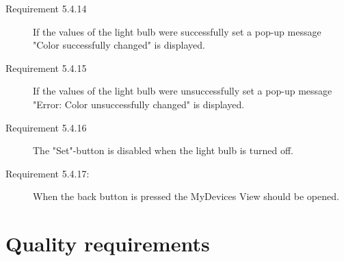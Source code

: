 \documentclass[a4paper]{article}
\begin{document}
\begin{description}
\item[Requirement 5.4.14] If the values of the light bulb were successfully set a pop-up message "Color successfully changed" is displayed.

\item[Requirement 5.4.15] If the values of the light bulb were unsuccessfully set a pop-up message "Error: Color unsuccessfully changed" is displayed.

\item[Requirement 5.4.16] The "Set"-button is disabled when the light bulb is turned off.

\item[Requirement 5.4.17:] When the back button is pressed the MyDevices View should be opened.

\end{description}

\section{Quality requirements}
\end{document}
